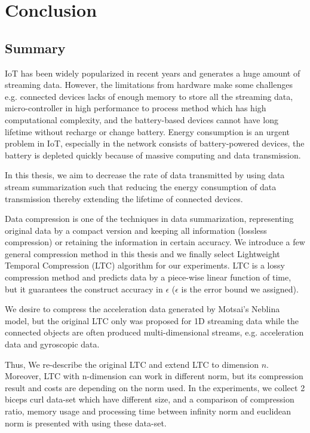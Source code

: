 \chapter{Conclusion}



\section{Summary}


IoT has been widely popularized in recent years and generates a huge amount of
streaming data. However, the limitations from hardware make some challenges e.g.
connected devices lacks of enough memory to store all the streaming data,
micro-controller in high performance to process method which has high
computational complexity, and the battery-based devices cannot have long
lifetime without recharge or change battery. Energy consumption is an urgent
problem in IoT, especially in the network consists of battery-powered devices,
the battery is depleted quickly because of massive computing and data
transmission.

In this thesis, we aim to decrease the rate of data transmitted by using data
stream summarization such that reducing the energy consumption of data
transmission thereby extending the lifetime of connected devices. 

Data compression is one of the techniques in data summarization, representing
original data by a compact version and keeping all information (lossless
compression) or retaining the information in certain accuracy. We introduce a
few general compression method in this thesis and we finally select Lightweight
Temporal Compression (LTC) algorithm for our experiments. LTC is a lossy
compression method and predicts data by a piece-wise linear function of time,
but it guarantees the construct accuracy in $\epsilon$ ($\epsilon$ is the error
bound we assigned). 

We desire to compress the acceleration data generated by Motsai's Neblina model,
but the original LTC only was proposed for 1D streaming data while the connected
objects are often produced multi-dimensional streams, e.g. acceleration data and
gyroscopic data.

Thus, We re-describe the original LTC and extend LTC to dimension $n$. Moreover,
LTC with n-dimension can work in different norm, but its compression result and
costs are depending on the norm used. In the experiments, we collect 2 biceps
curl data-set which have different size, and a comparison of compression ratio,
memory usage and processing time between infinity norm and euclidean norm is
presented with using these data-set.  

